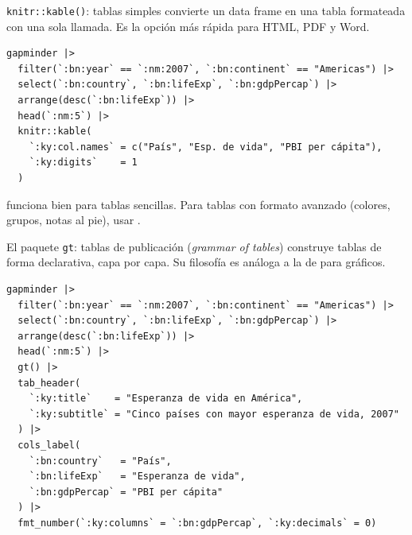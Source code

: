 \documentclass[8pt]{beamer}
\begin{document}
	\begin{frame}[fragile]{\texttt{knitr::kable()}: tablas simples}
		 convierte un data frame en una tabla formateada con una sola llamada. Es la opción más rápida para HTML, PDF y Word.

\begin{lstlisting}[style=RScript]
gapminder |>
  filter(`:bn:year` == `:nm:2007`, `:bn:continent` == "Americas") |>
  select(`:bn:country`, `:bn:lifeExp`, `:bn:gdpPercap`) |>
  arrange(desc(`:bn:lifeExp`)) |>
  head(`:nm:5`) |>
  knitr::kable(
    `:ky:col.names` = c("País", "Esp. de vida", "PBI per cápita"),
    `:ky:digits`    = 1
  )
\end{lstlisting}

		\begin{exampleblock}{}
			 funciona bien para tablas sencillas. Para tablas con formato avanzado (colores, grupos, notas al pie), usar .
		\end{exampleblock}
	\end{frame}


	\begin{frame}[fragile]{El paquete \texttt{gt}: tablas de publicación}
		 (\textit{grammar of tables}) construye tablas de forma declarativa, capa por capa. Su filosofía es análoga a la de  para gráficos.

\begin{lstlisting}[style=RScript]
gapminder |>
  filter(`:bn:year` == `:nm:2007`, `:bn:continent` == "Americas") |>
  select(`:bn:country`, `:bn:lifeExp`, `:bn:gdpPercap`) |>
  arrange(desc(`:bn:lifeExp`)) |>
  head(`:nm:5`) |>
  gt() |>
  tab_header(
    `:ky:title`    = "Esperanza de vida en América",
    `:ky:subtitle` = "Cinco países con mayor esperanza de vida, 2007"
  ) |>
  cols_label(
    `:bn:country`   = "País",
    `:bn:lifeExp`   = "Esperanza de vida",
    `:bn:gdpPercap` = "PBI per cápita"
  ) |>
  fmt_number(`:ky:columns` = `:bn:gdpPercap`, `:ky:decimals` = 0)
\end{lstlisting}
	\end{frame}
\end{document}
